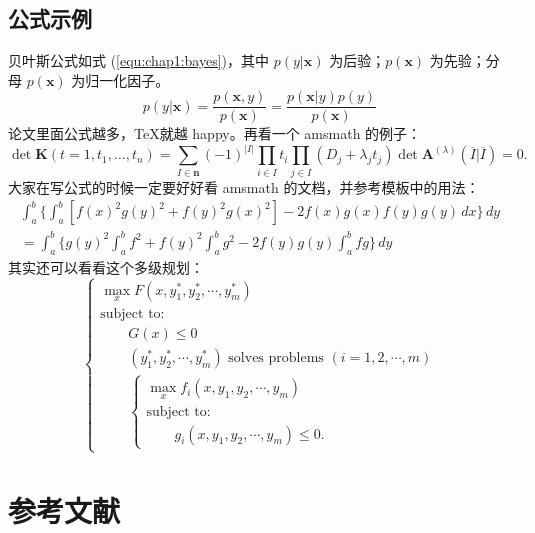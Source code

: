 \documentclass[twoside,doctor]{zjnuthesis}
\begin{document}
\subsection{公式示例}
贝叶斯公式如式 (\ref{equ:chap1:bayes})，其中 $p(y|\mathbf{x})$ 为后验；$p(\mathbf{x})$ 为先验；分母 $p(\mathbf{x})$ 为归一化因子。
\begin{equation}
  \label{equ:chap1:bayes}
  p(y|\mathbf{x}) = \frac{p(\mathbf{x},y)}{p(\mathbf{x})}=
  \frac{p(\mathbf{x}|y)p(y)}{p(\mathbf{x})} 
\end{equation}
论文里面公式越多，\TeX 就越 happy。再看一个 \textsf{amsmath} 的例子：
\newcommand{\envert}[1]{\left\lvert#1\right\rvert} 
\begin{equation}\label{detK2}
  \det\mathbf{K}(t=1,t_1,\dots,t_n)=\sum_{I\in\mathbf{n}}(-1)^{\envert{I}}
  \prod_{i\in I}t_i\prod_{j\in I}(D_j+\lambda_jt_j)\det\mathbf{A}
  ^{(\lambda)}(\overline{I}|\overline{I})=0.
\end{equation} 
大家在写公式的时候一定要好好看 \textsf{amsmath} 的文档，并参考模板中的用法：
\begin{multline*}\tag{[b]} 
  \int_a^b\biggl\{\int_a^b[f(x)^2g(y)^2+f(y)^2g(x)^2]
  -2f(x)g(x)f(y)g(y)\,dx\biggr\}\,dy \\
  =\int_a^b\biggl\{g(y)^2\int_a^bf^2+f(y)^2
  \int_a^b g^2-2f(y)g(y)\int_a^b fg\biggr\}\,dy
\end{multline*}
其实还可以看看这个多级规划：
\begin{equation}\label{bilevel}
  \left\{
    \begin{array}{l}
      \displaystyle \max_x F(x,y_1^*,y_2^*,\cdots,y_m^*)\\[0.2cm]
      \mbox{subject to:}\\[0.1cm]
      \qquad G(x)\le 0\\[0.1cm]
      \qquad(y_1^*,y_2^*,\cdots,y_m^*)\mbox{ solves problems }(i=1,2,\cdots,m)\\[0.1cm]
      \qquad\left\{\begin{array}{l}
                     \displaystyle \max_x f_i(x,y_1,y_2,\cdots,y_m)\\[0.2cm]
                     \mbox{subject to:}\\[0.1cm]
                     \qquad g_i(x,y_1,y_2,\cdots,y_m)\le 0.
                   \end{array}\right.
    \end{array}\right.
\end{equation}

\section{参考文献}
\end{document}
